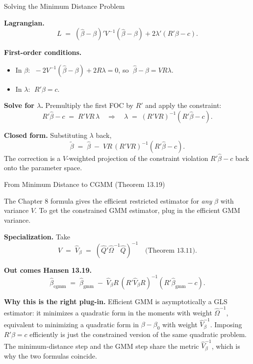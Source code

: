 \documentclass[aspectratio=169, handout]{beamer}
\numberwithin{equation}{section}
\begin{document}
\begin{frame}{Solving the Minimum Distance Problem}

\textbf{Lagrangian.}
$$L \;=\; (\hat\beta - \beta)'V^{-1}(\hat\beta - \beta) + 2\lambda'(R'\beta - c).$$

\smallskip
\textbf{First-order conditions.}
\begin{itemize}\itemsep=1pt
\item In $\beta$: $\;-2V^{-1}(\hat\beta - \beta) + 2R\lambda = 0$, so $\;\hat\beta - \beta = V R \lambda$.
\item In $\lambda$: $\;R'\beta = c$.
\end{itemize}

\smallskip
\textbf{Solve for $\lambda$.} Premultiply the first FOC by $R'$ and apply the constraint:
$$R'\hat\beta - c \;=\; R'V R\, \lambda \quad\Longrightarrow\quad \lambda \;=\; (R'VR)^{-1}(R'\hat\beta - c).$$

\smallskip
\textbf{Closed form.} Substituting $\lambda$ back,
$$\boxed{\;\tilde\beta \;=\; \hat\beta \;-\; V R\,(R'VR)^{-1}(R'\hat\beta - c).\;}$$
The correction is a $V$-weighted projection of the constraint violation $R'\hat\beta - c$ back onto the parameter space.

\end{frame}

\begin{frame}{From Minimum Distance to CGMM (Theorem 13.19)}

The Chapter 8 formula gives the efficient restricted estimator for \textit{any} $\hat\beta$ with variance $V$. To get the constrained GMM estimator, plug in the efficient GMM variance.

\medskip
\textbf{Specialization.} Take
$$V \;=\; \hat V_\beta \;=\; (\hat Q'\hat\Omega^{-1}\hat Q)^{-1} \quad\text{(Theorem 13.11).}$$

\medskip
\textbf{Out comes Hansen 13.19.}
$$\boxed{\;\hat\beta_{\text{cgmm}} \;=\; \hat\beta_{\text{gmm}} \;-\; \hat V_\beta R\,(R'\hat V_\beta R)^{-1}(R'\hat\beta_{\text{gmm}} - c).\;}$$

\medskip
\textbf{Why this is the right plug-in.} Efficient GMM is asymptotically a GLS estimator: it minimizes a quadratic form in the moments with weight $\hat\Omega^{-1}$, equivalent to minimizing a quadratic form in $\beta - \beta_0$ with weight $\hat V_\beta^{-1}$. Imposing $R'\beta = c$ efficiently is just the constrained version of the same quadratic problem. The minimum-distance step and the GMM step share the metric $\hat V_\beta^{-1}$, which is why the two formulas coincide.

\end{frame}
\end{document}
